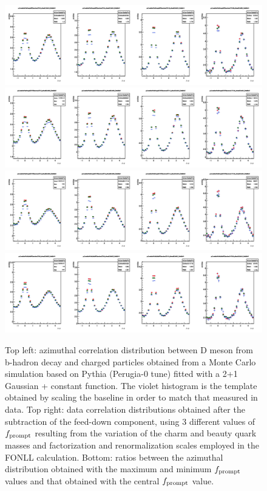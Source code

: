 \begin{figure}
\centering
\includegraphics[width=1\linewidth]{figures/Template/1DCompare_allDpTfromC_AssoPt_0dot3to99dot0GeVc_Perugia0.png}
\includegraphics[width=1\linewidth]{figures/Template/1DCompare_allDpTfromC_AssoPt_0dot3to99dot0GeVc_Perugia2010.png}
\includegraphics[width=1\linewidth]{figures/Template/1DCompare_allDpTfromC_AssoPt_0dot3to99dot0GeVc_Perugia2011.png}
\includegraphics[width=1\linewidth]{figures/Template/1DCompare_allDpTfromC_AssoPt_0dot3to99dot0GeVc_Pythia8.png}
\caption{Top left: azimuthal correlation distribution between D meson from b-hadron decay and charged particles obtained from a Monte Carlo simulation
based on Pythia (Perugia-0 tune) fitted with a 2+1 Gaussian + constant function. The violet histogram is the template obtained by scaling the baseline
in order to match that measured in data. Top right: data correlation distributions obtained after the subtraction of the feed-down component, using 3 different values of $f_{\rm prompt}$ resulting
from the variation of the charm and beauty quark masses and factorization and renormalization scales employed in the FONLL calculation. Bottom: ratios between the azimuthal
distribution obtained with the maximum and minimum $f_{\rm prompt}$ values and that obtained with the central $f_{\rm prompt}$ value.}
\label{templates2}
\end{figure}

